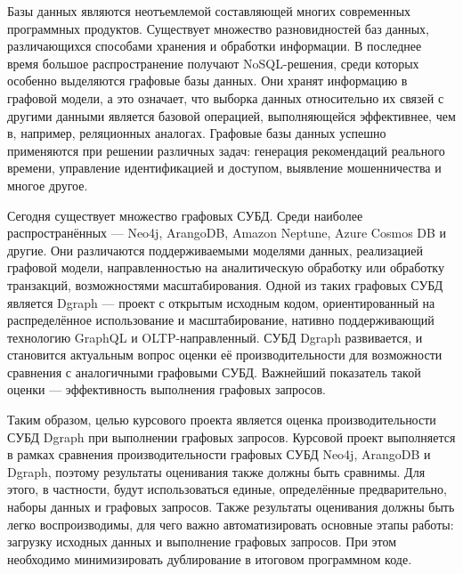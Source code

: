 
Базы данных являются неотъемлемой составляющей многих современных программных продуктов. Существует
множество разновидностей баз данных, различающихся способами хранения и обработки информации. В
последнее время большое распространение получают NoSQL-решения, среди которых особенно выделяются
графовые базы данных. Они хранят информацию в графовой модели, а это означает, что выборка данных
относительно их связей с другими данными является базовой операцией, выполняющейся эффективнее, чем в,
например, реляционных аналогах. Графовые базы данных успешно применяются при решении различных задач:
генерация рекомендаций реального времени, управление идентификацией и доступом, выявление мошенничества
и многое другое.

Сегодня существует множество графовых СУБД. Среди наиболее распространённых --- Neo4j, ArangoDB,
Amazon Neptune, Azure Cosmos DB и другие. Они различаются поддерживаемыми моделями данных, реализацией
графовой модели, направленностью на аналитическую обработку или обработку транзакций, возможностями
масштабирования. Одной из таких графовых СУБД является Dgraph --- проект с открытым исходным кодом,
ориентированный на распределённое использование и масштабирование, нативно поддерживающий технологию
GraphQL и OLTP-направленный. СУБД Dgraph развивается, и становится актуальным вопрос оценки
её производительности для возможности сравнения с аналогичными графовыми СУБД. Важнейший показатель
такой оценки --- эффективность выполнения графовых запросов.

Таким образом, целью курсового проекта является оценка производительности СУБД Dgraph при
выполнении графовых запросов. Курсовой проект выполняется в рамках сравнения производительности
графовых СУБД Neo4j, ArangoDB и Dgraph, поэтому результаты оценивания также должны быть сравнимы.
Для этого, в частности, будут использоваться единые, определённые предварительно, наборы данных и
графовых запросов. Также результаты оценивания должны быть легко воспроизводимы, для чего важно
автоматизировать основные этапы работы: загрузку исходных данных и выполнение графовых запросов.
При этом необходимо минимизировать дублирование в итоговом программном коде.

